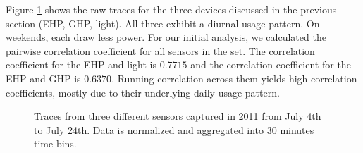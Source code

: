 Figure \ref{fig:raw} shows the raw traces for the three devices discussed in 
the previous section (EHP, GHP, light). All three exhibit a diurnal usage pattern.  On weekends, each
draw less power.   For our initial analysis, we calculated the pairwise 
correlation coefficient for all sensors in the set.  The correlation coefficient for 
 the EHP and light is $0.7715$ and the correlation coefficient for the EHP and GHP is $0.6370$.
Running correlation across them yields high correlation coefficients, mostly
due to their underlying daily usage pattern.


\begin{figure}[t!]
\centering
 \caption{Traces from three different sensors captured in 2011 from July 4th to July 24th. Data is normalized and aggregated into 30 minutes time bins.}
 \label{fig:raw}
\end{figure}



